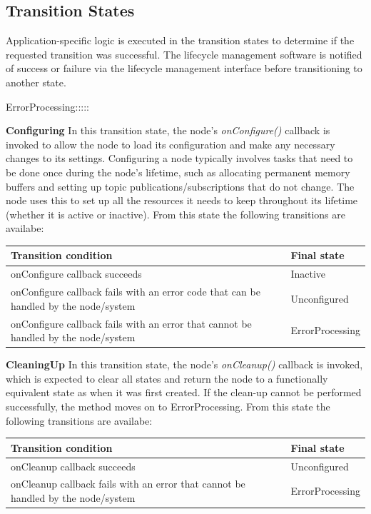 	\subsection{Transition States} 
	Application-specific logic is executed in the transition states to determine if the requested transition was successful. The lifecycle management software is notified of success or failure via the lifecycle management interface before transitioning to another state.
	\begin{labeling}{ErrorProcessing:::::}
		\item[\textbf{Configuring}] In this transition state, the node's \textit{onConfigure()} callback is invoked to allow the node to load its configuration and make any necessary changes to its settings. Configuring a node typically involves tasks that need to be done once during the node's lifetime, such as allocating permanent memory buffers and setting up topic publications/subscriptions that do not change. The node uses this to set up all the resources it needs to keep throughout its lifetime (whether it is active or inactive). 
		From this state the following transitions are availabe:
		\begin{table}[H]
			\flushright
			\label{tab:Valid transitions}
			\begin{tabular}{|p{8.5cm}|p{3cm}|}
				\toprule
				Transition condition & Final state\\
				\midrule
				onConfigure callback succeeds & Inactive  \\
				onConfigure callback fails with an error code that can be handled by the node/system & Unconfigured \\
				onConfigure callback fails with an error that cannot be handled by the node/system  & ErrorProcessing \\
				\bottomrule
			\end{tabular}
		\end{table}

		\item[\textbf{CleaningUp}] In this transition state, the node's \textit{onCleanup()} callback is invoked, which is expected to clear all states and return the node to a functionally equivalent state as when it was first created. If the clean-up cannot be performed successfully, the method moves on to ErrorProcessing.
		From this state the following transitions are availabe:
		\begin{table}[H]
			\flushright
			\label{tab:Valid transitions}
			\begin{tabular}{|p{8.5cm}|p{3cm}|}
				\toprule
				Transition condition & Final state\\
				\midrule
				onCleanup callback succeeds & Unconfigured \\
				onCleanup callback fails with an error that cannot be handled by the node/system  & ErrorProcessing \\
				\bottomrule
			\end{tabular}
		\end{table}


\end{labeling}
